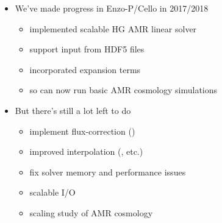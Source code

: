 
%

\begin{frame}[fragile,label=s-summary] 
\begin{itemize}
\item We've made progress in Enzo-P/Cello in 2017/2018
\begin{itemize}
\item implemented scalable HG AMR linear solver
\item support input from HDF5 files
\item incorporated expansion terms
\item so can now run basic AMR cosmology simulations
\end{itemize}
\item But there's still a lot left to do
\begin{itemize}
\item implement flux-correction ()
\item improved interpolation (, etc.)
\item fix solver memory and performance issues
\item scalable I/O
\item scaling study of AMR cosmology
\end{itemize}
\end{itemize}
\end{frame}



